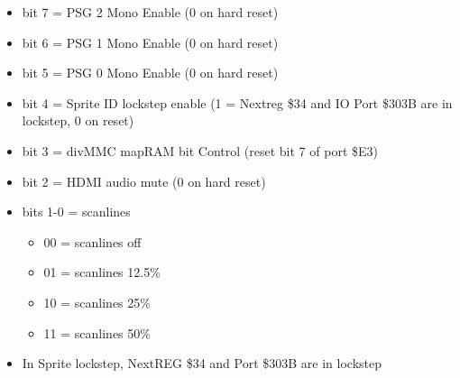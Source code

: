 \begin{itemize}
\item bit 7 = PSG 2 Mono Enable (0 on hard reset)
\item bit 6 = PSG 1 Mono Enable (0 on hard reset)
\item bit 5 = PSG 0 Mono Enable (0 on hard reset)
\item bit 4 = Sprite ID lockstep enable (1 = Nextreg \$34 and IO Port
  \$303B are in lockstep, 0 on reset)
\item bit 3 = divMMC mapRAM bit Control (reset bit 7 of port \$E3)
\item bit 2 = HDMI audio mute (0 on hard reset)
\item bits 1-0 = scanlines
  \begin{itemize}
  \item 00 = scanlines off
  \item 01 = scanlines 12.5\%
  \item 10 = scanlines 25\%
  \item 11 = scanlines 50\%
  \end{itemize}
\item[] In Sprite lockstep, NextREG \$34 and Port \$303B are in
  lockstep
\end{itemize}

